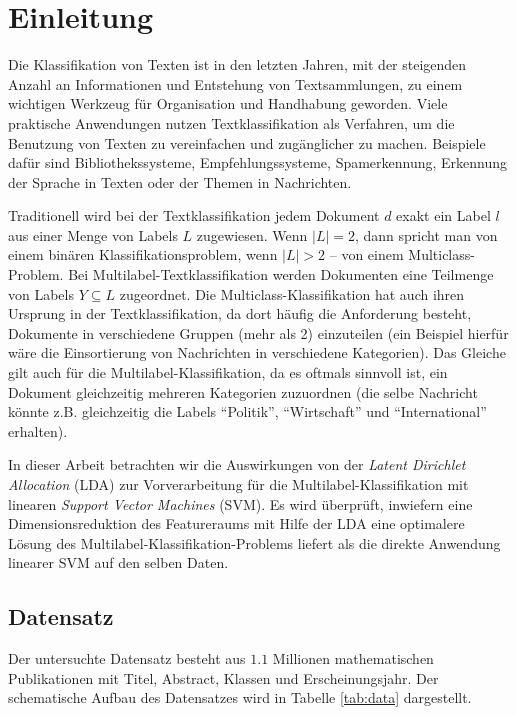 \section{Einleitung}
Die Klassifikation von Texten ist in den letzten Jahren, mit der steigenden Anzahl an Informationen und Entstehung von Textsammlungen, zu einem wichtigen Werkzeug für Organisation und Handhabung geworden.
Viele praktische Anwendungen nutzen Textklassifikation als Verfahren, um die Benutzung von Texten zu vereinfachen und zugänglicher zu machen.
Beispiele dafür sind Bibliothekssysteme, Empfehlungssysteme, Spamerkennung, Erkennung der Sprache in Texten oder der Themen in Nachrichten.

Traditionell wird bei der Textklassifikation jedem Dokument $d$ exakt ein Label $l$ aus einer Menge von Labels $L$ zugewiesen.
Wenn $|L| = 2$, dann spricht man von einem binären Klassifikationsproblem, wenn $|L| > 2$ -- von einem Multiclass-Problem.
Bei Multilabel-Textklassifikation werden Dokumenten eine Teilmenge von Labels $Y \subseteq L$ zugeordnet.
Die Multiclass-Klassifikation hat auch ihren Ursprung in der Textklassifikation, da dort häufig die Anforderung besteht, Dokumente in verschiedene Gruppen (mehr als 2) einzuteilen (ein Beispiel hierfür wäre die Einsortierung von Nachrichten in verschiedene Kategorien).
Das Gleiche gilt auch für die Multilabel-Klassifikation, da es oftmals sinnvoll ist, ein Dokument gleichzeitig mehreren Kategorien zuzuordnen (die selbe Nachricht könnte z.B. gleichzeitig die Labels ``Politik'', ``Wirtschaft'' und ``International'' erhalten).

In dieser Arbeit betrachten wir die Auswirkungen von der \emph{Latent Dirichlet Allocation} (LDA) zur Vorverarbeitung für die Multilabel-Klassifikation mit linearen \emph{Support Vector Machines} (SVM).
Es wird überprüft, inwiefern eine Dimensionsreduktion des Featureraums mit Hilfe der LDA eine optimalere Lösung des Multilabel-Klassifikation-Problems liefert als die direkte Anwendung linearer SVM auf den selben Daten.

\subsection{Datensatz}
\label{sub:datensatz}
Der untersuchte Datensatz besteht aus $1.1$ Millionen mathematischen Publikationen mit Titel, Abstract, Klassen und Erscheinungsjahr.
Der schematische Aufbau des Datensatzes wird in Tabelle \ref{tab:data} dargestellt.

